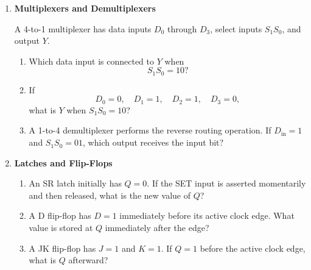 \documentclass{article}
\begin{document}
\begin{enumerate}
\begin{enumerate}
\vspace{0.7cm}

\item A decimal-to-BCD encoder has the input line corresponding to
 decimal 6 HIGH. What 4-bit BCD code should appear at its output?

\vspace{0.7cm}
\end{enumerate}

\item \textbf{Multiplexers and Demultiplexers}

A 4-to-1 multiplexer has data inputs $D_0$ through $D_3$, select
inputs $S_1S_0$, and output $Y$.

\begin{enumerate}
\item Which data input is connected to $Y$ when
\[
S_1S_0=10?
\]

\vspace{0.6cm}

\item If
\[
D_0=0,\quad D_1=1,\quad D_2=1,\quad D_3=0,
\]
what is $Y$ when $S_1S_0=10$?

\vspace{0.6cm}

\item A 1-to-4 demultiplexer performs the reverse routing operation.
If $D_{\mathrm{in}}=1$ and $S_1S_0=01$, which output receives the
input bit?

\vspace{0.7cm}
\end{enumerate}

\item \textbf{Latches and Flip-Flops}

\begin{enumerate}
\item An SR latch initially has $Q=0$. If the SET input is asserted
momentarily and then released, what is the new value of $Q$?

\vspace{0.6cm}

\item A D flip-flop has $D=1$ immediately before its active clock
edge. What value is stored at $Q$ immediately after the edge?

\vspace{0.6cm}

\item A JK flip-flop has $J=1$ and $K=1$. If $Q=1$ before the active
clock edge, what is $Q$ afterward?


\end{enumerate}
\end{enumerate}
\end{document}
